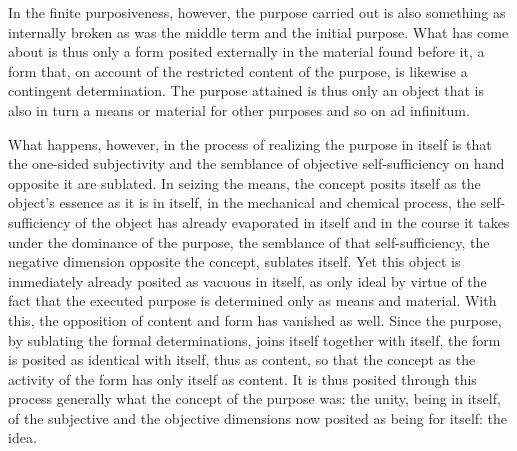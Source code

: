 In the finite purposiveness, however,
the purpose carried out is also
something as internally broken
as was the middle term and the initial purpose.
What has come about is thus only a form
posited externally in the material found before it,
a form that, on account of the restricted content of
the purpose, is likewise a contingent determination.
The purpose attained is thus only an object
that is also in turn a means
or material for other purposes
and so on ad infinitum.

What happens, however, in the process of
realizing the purpose in itself is
that the one-sided subjectivity
and the semblance of objective self-sufficiency
on hand opposite it are sublated.
In seizing the means, the concept posits itself
as the object's essence as it is in itself,
in the mechanical and chemical process,
the self-sufficiency of the object
has already evaporated in itself
and in the course it takes under
the dominance of the purpose,
the semblance of that self-sufficiency,
the negative dimension opposite the concept,
sublates itself.
Yet this object is immediately
already posited as vacuous in itself,
as only ideal by virtue of the fact
that the executed purpose is determined
only as means and material.
With this, the opposition of content and form
has vanished as well.
Since the purpose, by sublating the formal determinations,
joins itself together with itself,
the form is posited as identical with itself,
thus as content,
so that the concept as the activity of
the form has only itself as content.
It is thus posited through this process generally
what the concept of the purpose was:
the unity, being in itself,
of the subjective and the objective dimensions
now posited as being for itself:
the idea.
